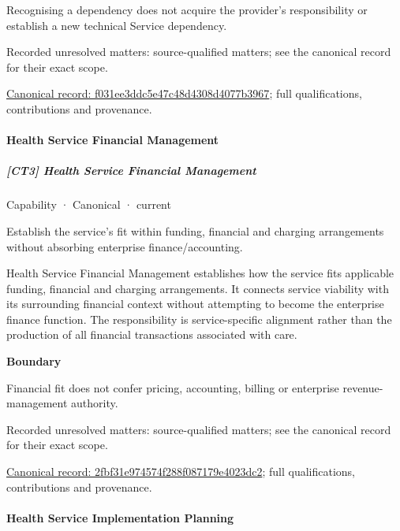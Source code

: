 Recognising a dependency does not acquire the provider's responsibility or establish a new technical Service dependency.


{\small Recorded unresolved matters: source-qualified matters; see the canonical record for their exact scope.}\par
{\footnotesize \href{../../../../continuum/strategy/capability/f031ee3ddc5e47c48d4308d4077b3967.md}{Canonical record: f031ee3ddc5e47c48d4308d4077b3967}; full qualifications, contributions and provenance.}\par
\paragraph{Health Service Financial Management}

\subparagraph{[CT3] Health Service Financial Management}

\label{element:2fbf31e974574f288f087179e4023dc2}
{\small Capability · Canonical · current}\par

Establish the service’s fit within funding, financial and charging arrangements without absorbing enterprise finance/accounting.



Health Service Financial Management establishes how the service fits applicable funding, financial and charging arrangements. It connects service viability with its surrounding financial context without attempting to become the enterprise finance function. The responsibility is service-specific alignment rather than the production of all financial transactions associated with care.



\textbf{Boundary}



Financial fit does not confer pricing, accounting, billing or enterprise revenue-management authority.


{\small Recorded unresolved matters: source-qualified matters; see the canonical record for their exact scope.}\par
{\footnotesize \href{../../../../continuum/strategy/capability/2fbf31e974574f288f087179e4023dc2.md}{Canonical record: 2fbf31e974574f288f087179e4023dc2}; full qualifications, contributions and provenance.}\par
\paragraph{Health Service Implementation Planning}

